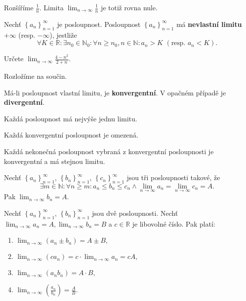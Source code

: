 \begin{reseni}
Rozšíříme $\frac{1}{n}$. Limita $\lim_{n\to \infty}\frac{1}{n}$ je totiž rovna nule.
\end{reseni}

\begin{definition}
Nechť $\left \{ a_n \right \}_{n=1}^\infty $ je posloupnost.
Posloupnost $\left \{ a_n \right \}_{n=1}^\infty $ má \textbf{nevlastní limitu}
$+\infty$ (resp. $-\infty$), jestliže
$$\forall K \in \mathbb R: \exists n_0 \in \mathbb N_0: \forall n \geq n_0, n\in \mathbb N: a_n>K \,\, (\textrm{resp. } a_n<K).$$
\end{definition}

\begin{priklad}
Určete $\lim_{n\to \infty}\frac{4-n^2}{2+n}.$
\end{priklad}

\begin{reseni}
Rozložíme na součin.
\end{reseni}

\begin{definition}
    Má-li posloupnost vlastní limitu, je \textbf{konvergentní}. V opačném
    případě je \textbf{divergentní}.
\end{definition}

\begin{veta}
    Každá posloupnost má nejvýše jednu limitu.
\end{veta}

\begin{veta}
    Každá konvergentní posloupnost je omezená.
\end{veta}

\begin{veta}
    Každá nekonečná posloupnost vybraná z konvergentní posloupnosti
    je konvergentní a má stejnou limitu.
\end{veta}

\begin{veta}
    Nechť $\left \{ a_n \right \}_{n=1}^\infty $, $\left \{ b_n \right \}_{n=1}^\infty $,
    $\left \{ c_n \right \}_{n=1}^\infty $ jsou tři posloupnosti takové, že
    $$\exists m\in \mathbb N: \forall n \geq m:a_n \leq b_n \leq c_n \land \lim_{n\to \infty}a_n=\lim_{n\to \infty}c_n=A.$$
    Pak $\lim_{n\to\infty}b_n=A.$
\end{veta}

\begin{veta}
Nechť $\left \{ a_n \right \}_{n=1}^\infty $, $\left \{ b_n \right \}_{n=1}^\infty $
jsou dvě posloupnosti. Nechť $\lim_{n\to \infty}a_n = A, \lim_{n\to \infty}b_n = B$
a $c\in \mathbb R$ je libovolné číslo. Pak platí:
\begin{enumerate}[$i.$]
\item $\lim_{n\to \infty}\left ( a_n\pm b_n \right ) =A\pm B,$
\item $\lim_{n\to\infty}\left ( ca_n \right ) =c\cdot \lim_{n\to\infty}a_n=cA,$
\item $\lim_{n\to\infty}\left ( a_nb_n \right )=A\cdot B, $
\item $\lim_{n\to\infty}\left ( \frac{a_n}{b_n} \right ) =\frac{A}{B}.$
\end{enumerate}
\end{veta}

